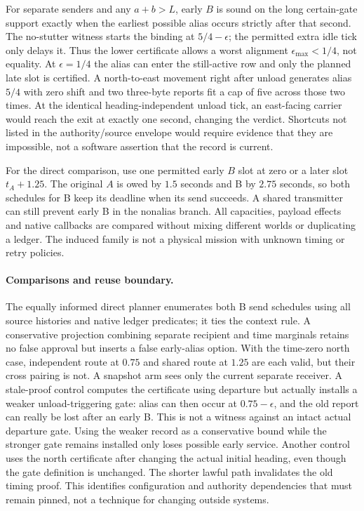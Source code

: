 \documentclass{article}
\begin{document}
For separate senders and any \(a+b>L\), early \(B\)
is sound on the long certain-gate support exactly when the
earliest possible alias occurs strictly after that second.
The no-stutter witness starts the binding at \(5/4-\epsilon\);
the permitted extra idle tick only delays it. Thus the
lower certificate allows a worst alignment
\(\epsilon_{\max}<1/4\), not equality. At \(\epsilon=1/4\)
the alias can enter the still-active row and only the planned
late slot is certified. A north-to-east movement right after
unload generates alias \(5/4\) with zero shift and two
three-byte reports fit a cap of five across those two times.
At the identical heading-independent unload tick, an east-facing
carrier would reach the exit at exactly one second, changing
the verdict. Shortcuts not listed in the authority/source
envelope would require evidence that they are impossible, not
a software assertion that the record is current.

For the direct comparison, use one permitted early \(B\) slot
at zero or a later slot \(t_A+1.25\).
The original \(A\) is owed by \(1.5\) seconds and B by \(2.75\)
seconds, so both schedules for B keep its deadline when its
send succeeds. A shared transmitter can still prevent early
B in the nonalias branch. All capacities,
payload effects and native callbacks are compared without mixing
different worlds or duplicating a ledger. The induced family
is not a physical mission with unknown timing or retry policies.

\paragraph{Comparisons and reuse boundary.}
The equally informed direct planner enumerates both B send
schedules using all source histories and native ledger predicates;
it ties the context rule. A conservative projection combining
separate recipient and time marginals retains no false approval
but inserts a false early-alias option. With the time-zero
north case, independent route at \(0.75\) and shared route
at \(1.25\) are each valid, but their cross pairing is not.
A snapshot arm sees only the current separate receiver.
A stale-proof control computes the certificate using departure
but actually installs a weaker unload-triggering gate: alias
can then occur at \(0.75-\epsilon\), and the old report
can really be lost after an early B. This is not a witness
against an intact actual departure gate. Using the weaker
record as a conservative bound while the stronger gate remains
installed only loses possible early service. Another control
uses the north certificate after changing the actual initial
heading, even though the gate definition is unchanged. The
shorter lawful path invalidates the old timing proof. This
identifies configuration and authority dependencies that must
remain pinned, not a technique for changing outside systems.
\end{document}
